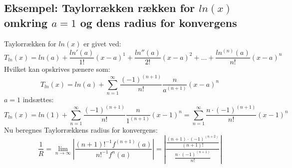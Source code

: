 \subsection*{\textbf{Eksempel:} Taylorrækken rækken for $ln(x)$ omkring $a = 1$ og dens radius for konvergens} %
Taylorrækken for $ln(x)$ er givet ved:
\[
    T_{ln}(x) = ln(a) + \frac{ln'(a)}{1!}(x-a)^1 + \frac{ln''(a)}{2!}(x-a)^2 + \ldots + \frac{ln^{(n)}(a)}{n!}(x - a)^n
\]
Hvilket kan opskrives pænere som:
\[
    T_{ln}(x) = ln(a) + \sum^{\infty}_{n = 1} \frac{(-1)^{(n + 1)}}{n!} \frac{n}{a^{(n+1)}}(x-a)^n
\]
$a = 1$ indsættes:
\[
    T_{ln}(x) = ln(1) + \sum^{\infty}_{n = 1} \frac{(-1)^{(n + 1)}}{n!} \frac{n}{1^{(n+1)}}(x-1)^n = \sum^{\infty}_{n = 1} \frac{n \cdot (-1)^{(n + 1)}}{n!} (x-1)^n
\]
Nu beregnes Taylorrækkens radius for konvergens: %
\[
    \frac{1}{R} = \lim_{n \rightarrow \infty} \left\lvert \frac{(n + 1)!^{-1}f^{(n+1)}(a)}{n!^{-1}f^n(a)} \right\lvert
    = \left\lvert \frac{\frac{(n+1) \cdot (-1)^{(n + 2)}}{(n+1)!}}{\frac{n \cdot (-1)^{(n + 1)}}{n!}} \right\lvert
\]


